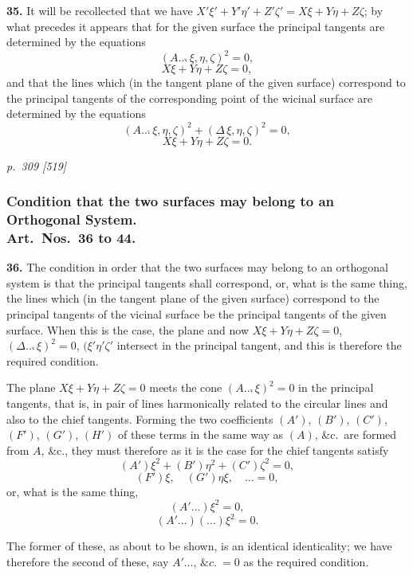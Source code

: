 \documentclass[11pt,a4paper]{book}
\begin{document}
\textbf{35.} It will be recollected that we have $X'\xi' + Y'\eta' + Z'\zeta' = X\xi + Y\eta + Z\zeta$; by what precedes it appears that for the given surface the principal tangents are determined by the equations
\[
(A\ldots\check{}\,\xi,\eta,\zeta)^2 = 0,
\]
\[
X\xi + Y\eta + Z\zeta = 0,
\]
and that the lines which (in the tangent plane of the given surface) correspond to the principal tangents of the corresponding point of the wicinal surface are determined by the equations
\[
(A\ldots\check{}\,\xi,\eta,\zeta)^2 + (\Delta\check{}\,\xi,\eta,\zeta)^2 = 0,
\]
\[
X\xi + Y\eta + Z\zeta = 0.
\]

\clearpage

\bigskip
\textit{p.~309 [519]}
\smallskip

\subsubsection*{Condition that the two surfaces may belong to an Orthogonal System.\\
Art.\ Nos.~36 to 44.}

\textbf{36.} The condition in order that the two surfaces may belong to an orthogonal system is that the principal tangents shall correspond, or, what is the same thing, the lines which (in the tangent plane of the given surface) correspond to the principal tangents of the vicinal surface be the principal tangents of the given surface. When this is the case, the plane and now $X\xi + Y\eta + Z\zeta = 0$, $(\Delta\ldots\check{}\,\xi)^2 = 0$, $(\xi'\eta'\zeta'$ inter\-sect in the principal tangent, and this is therefore the required condition.

The plane $X\xi + Y\eta + Z\zeta = 0$ meets the cone $(A\ldots\check{}\,\xi)^2 = 0$ in the principal tangents, that is, in pair of lines harmonically related to the circular lines and also to the chief tangents. Forming the two coefficients $(A')$, $(B')$, $(C')$, $(F')$, $(G')$, $(H')$ of these terms in the same way as $(A)$, \&c.\ are formed from $A$, \&c., they must therefore as it is the case for the chief tangents satisfy
\[
(A')\xi^2 + (B')\eta^2 + (C')\zeta^2 = 0,
\]
\[
(F')\xi, \quad (G')\eta\xi, \quad \ldots = 0,
\]
or, what is the same thing,
\[
(A'\ldots)\xi^2 = 0,
\]
\[
(A'\ldots)(\ldots)\xi^2 = 0.
\]

The former of these, as about to be shown, is an identical identicality; we have therefore the second of these, say $A'\ldots$, $\&c.\ = 0$ as the required condition.
\end{document}
